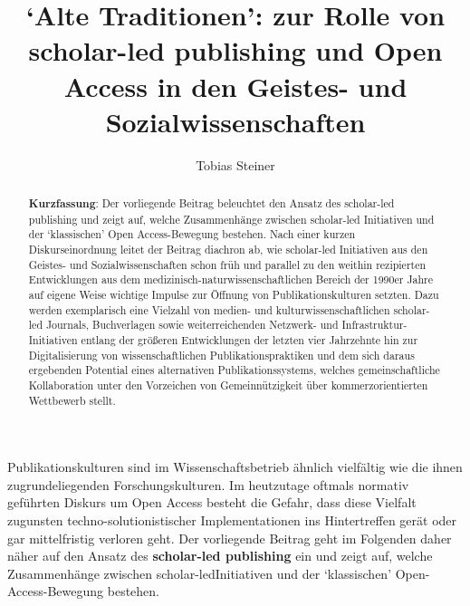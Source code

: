 \documentclass[a4paper,
fontsize=11pt,
oneside,
numbers=noperiodatend,
parskip=half-,
bibliography=totoc,
final
]{scrartcl}
\title{\LARGE{\enquote*{Alte Traditionen}: zur Rolle von scholar-led publishing und Open Access in den Geistes- und Sozialwissenschaften}}%
\author{Tobias Steiner} %
\date{}
\begin{document}
\maketitle
\thispagestyle{fancyplain} 

\begin{abstract}
\noindent
\textbf{Kurzfassung}: Der vorliegende Beitrag beleuchtet den Ansatz des
scholar-led publishing und zeigt auf, welche Zusammenhänge zwischen
scholar-led Initiativen und der \enquote*{klassischen} Open Access-Bewegung
bestehen. Nach einer kurzen Diskurseinordnung leitet der Beitrag
diachron ab, wie scholar-led Initiativen aus den Geistes- und
Sozialwissenschaften schon früh und parallel zu den weithin rezipierten
Entwicklungen aus dem medizinisch-naturwissenschaftlichen Bereich der
1990er Jahre auf eigene Weise wichtige Impulse zur Öffnung von
Publikationskulturen setzten. Dazu werden exemplarisch eine Vielzahl von
medien- und kulturwissenschaftlichen scholar-led Journals, Buchverlagen
sowie weiterreichenden Netzwerk- und Infrastruktur-Initiativen entlang
der größeren Entwicklungen der letzten vier Jahrzehnte hin zur
Digitalisierung von wissenschaftlichen Publikationspraktiken und dem
sich daraus ergebenden Potential eines alternativen Publikationssystems,
welches gemeinschaftliche Kollaboration unter den Vorzeichen von
Gemeinnützigkeit über kommerzorientierten Wettbewerb stellt.
\end{abstract}

Publikationskulturen sind im Wissenschaftsbetrieb ähnlich vielfältig wie
die ihnen zugrundeliegenden Forschungskulturen. Im heutzutage oftmals
normativ geführten Diskurs um Open Access besteht die Gefahr, dass diese
Vielfalt zugunsten techno-solutionistischer Implementationen ins
Hintertreffen gerät oder gar mittelfristig verloren geht. Der
vorliegende Beitrag geht im Folgenden daher näher auf den Ansatz des
\textbf{scholar-led publishing} ein und zeigt auf, welche Zusammenhänge
zwischen scholar-ledInitiativen und der \enquote*{klassischen}
Open-Access-Bewegung bestehen.
\end{document}
